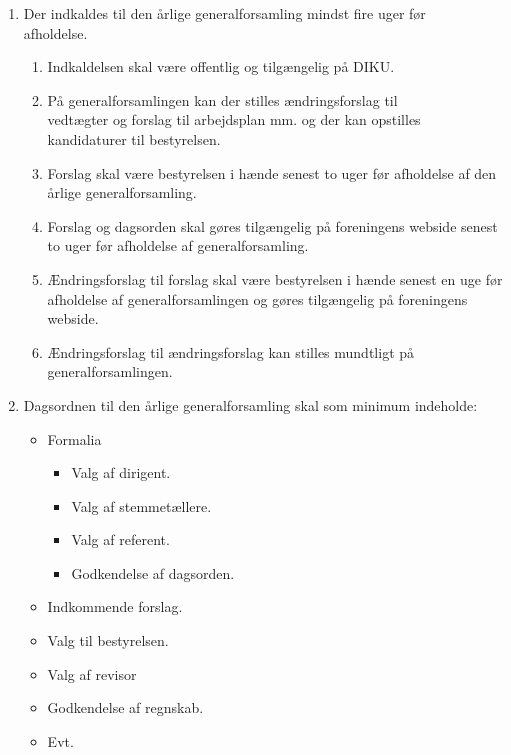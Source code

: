 \documentclass[a4paper]{article}
\newenvironment{stykenum}{
  \begin{enumerate}[%
    label=Stk.~\arabic*., ref=\theenumi~Stk.~\arabic*, start=2]
}{\end{enumerate}}
\begin{document}
\begin{enumerate}[resume*=afsnit]

\item Der indkaldes til den årlige generalforsamling mindst fire uger før\\ afholdelse.

  \begin{stykenum}

  \item Indkaldelsen skal være offentlig og tilgængelig på DIKU.

  \item På generalforsamlingen kan der stilles ændringsforslag til\\vedtægter og
        forslag til arbejdsplan mm. og der kan opstilles\\kandidaturer til
        bestyrelsen.

  \item Forslag skal være bestyrelsen i hænde senest to uger før afholdelse af
        den årlige generalforsamling.

  \item Forslag og dagsorden skal gøres tilgængelig på foreningens webside
        senest to uger før afholdelse af generalforsamling.

  \item Ændringsforslag til forslag skal være bestyrelsen i hænde senest en uge
        før afholdelse af generalforsamlingen og gøres tilgængelig på
        foreningens webside.

  \item Ændringsforslag til ændringsforslag kan stilles mundtligt på
        generalforsamlingen.

  \end{stykenum}

\item Dagsordnen til den årlige generalforsamling skal som minimum indeholde:

  \begin{itemize}
  \item Formalia
    \begin{itemize}
    \item Valg af dirigent.
    \item Valg af stemmetællere.
    \item Valg af referent.
    \item Godkendelse af dagsorden.
    \end{itemize}
  \item Indkommende forslag.
  \item Valg til bestyrelsen.
  \item Valg af revisor
  \item Godkendelse af regnskab.
  \item Evt.
  \end{itemize}

\end{enumerate}
\end{document}
